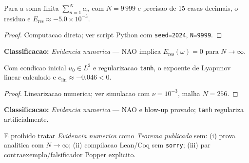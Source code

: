 \begin{lemma}\label{lem:residuo}
Para a soma finita $\sum_{n=1}^{N} a_n$ com $N = 9\,999$ e precisao
de 15 casas decimais, o residuo e $E_{\mathrm{res}} \approx -5.0 \times 10^{-5}$.
\end{lemma}
\begin{proof}
Computacao direta; ver script Python com \texttt{seed=2024}, \texttt{N=9999}.
\end{proof}
\textbf{Classificacao:} \emph{Evidencia numerica} —
NAO implica $E_{\mathrm{res}}(\omega) = 0$ para $N \to \infty$.

\begin{lemma}\label{lem:linear}
Com condicao inicial $u_0 \in L^2$ e regularizacao \texttt{tanh},
o expoente de Lyapunov linear calculado e $e_{\mathrm{lin}} \approx -0.046 < 0$.
\end{lemma}
\begin{proof}
Linearizacao numerica; ver simulacao com $\nu = 10^{-3}$, malha $N=256$.
\end{proof}
\textbf{Classificacao:} \emph{Evidencia numerica} —
NAO e blow-up provado; \texttt{tanh} regulariza artificialmente.

\begin{remark}
E proibido tratar \emph{Evidencia numerica} como \emph{Teorema publicado}
sem: (i) prova analitica com $N \to \infty$; (ii) compilacao Lean/Coq
sem \texttt{sorry}; (iii) par contraexemplo/falsificador Popper explicito.
\end{remark}
